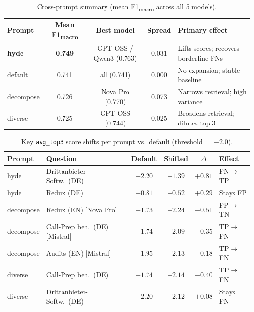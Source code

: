 \begin{table}[htbp]
\centering
\caption{Cross-prompt summary (mean F1\textsubscript{macro} across all 5 models).}
\label{tab:cg-cross-prompt}
\begin{tabular}{lcccp{4.8cm}}
\toprule
Prompt & Mean F1\textsubscript{macro} & Best model & Spread & Primary effect \\
\midrule
\textbf{hyde}   & \textbf{0.749} & GPT-OSS / Qwen3 (0.763) & 0.031 & Lifts scores; recovers borderline FNs \\
default         & 0.741          & all (0.741)              & 0.000 & No expansion; stable baseline \\
decompose       & 0.726          & Nova Pro (0.770)         & 0.073 & Narrows retrieval; high variance \\
diverse         & 0.725          & GPT-OSS (0.744)          & 0.025 & Broadens retrieval; dilutes top-3 \\
\bottomrule
\end{tabular}
\end{table}

\begin{table}[htbp]
\centering
\caption{Key \texttt{avg\_top3} score shifts per prompt vs.\ default (threshold $= -2.0$).}
\label{tab:cg-prompt-shifts}
\begin{tabular}{llcccl}
\toprule
Prompt & Question & Default & Shifted & $\Delta$ & Effect \\
\midrule
hyde      & Drittanbieter-Softw.\ (DE)  & $-2.20$ & $\mathbf{-1.39}$ & $+0.81$ & FN$\to$TP \\
hyde      & Redux (DE)                  & $-0.81$ & $-0.52$           & $+0.29$ & Stays FP \\
decompose & Redux (EN) \scriptsize{[Nova Pro]}  & $-1.73$ & $\mathbf{-2.24}$ & $-0.51$ & FP$\to$TN \\
decompose & Call-Prep ben.\ (DE) \scriptsize{[Mistral]} & $-1.74$ & $\mathbf{-2.09}$ & $-0.35$ & TP$\to$FN \\
decompose & Audits (EN) \scriptsize{[Mistral]}  & $-1.95$ & $\mathbf{-2.13}$ & $-0.18$ & TP$\to$FN \\
diverse   & Call-Prep ben.\ (DE)        & $-1.74$ & $\mathbf{-2.14}$ & $-0.40$ & TP$\to$FN \\
diverse   & Drittanbieter-Softw.\ (DE)  & $-2.20$ & $-2.12$           & $+0.08$ & Stays FN \\
\bottomrule
\end{tabular}
\end{table}
